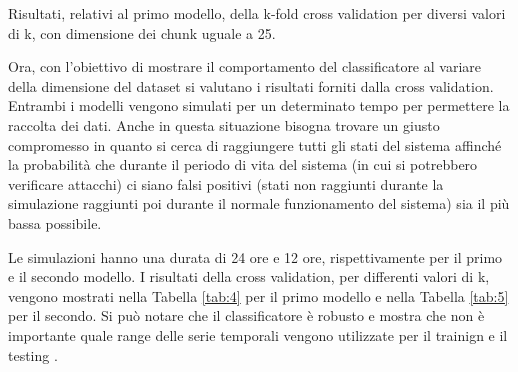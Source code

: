 \documentclass[Lau,binding=0.6cm]{sapthesis}
\begin{document}
\begin{table}[t]
    \begin{center}
    \end{center}   
    \caption{Risultati, relativi al primo modello, della k-fold cross validation per diversi valori di k, con dimensione dei chunk uguale a 25.} 
    \label{tab:4}
    \begin{center}
    \end{center}
    \caption{Risultati, relativi al secondo modello, della k-fold cross validation per diversi valori di k, con dimensione dei chunk uguale a 80.}
    \label{tab:5}
\end{table}

Ora, con l'obiettivo di mostrare il comportamento del classificatore al variare della dimensione del dataset si valutano i risultati  forniti dalla cross validation.
Entrambi i modelli vengono simulati per un determinato tempo per permettere la raccolta dei dati. Anche in questa situazione bisogna trovare un giusto compromesso in quanto 
si cerca di raggiungere tutti gli stati del sistema affinché la probabilit\`a che durante il periodo di vita del sistema (in cui si potrebbero verificare attacchi) ci siano falsi positivi (stati non raggiunti durante la simulazione raggiunti poi durante il normale funzionamento del sistema) sia il pi\`u bassa possibile.

Le simulazioni hanno una durata di 24 ore e 12 ore, rispettivamente per il primo e il secondo modello.
I risultati della cross validation, per differenti valori di k, vengono mostrati nella Tabella \ref{tab:4} per il primo modello e nella Tabella \ref{tab:5} per il secondo.
Si pu\`o notare che il classificatore \`e robusto e mostra che non \`e importante quale range delle serie temporali vengono utilizzate per il trainign e il testing  .
\end{document}
